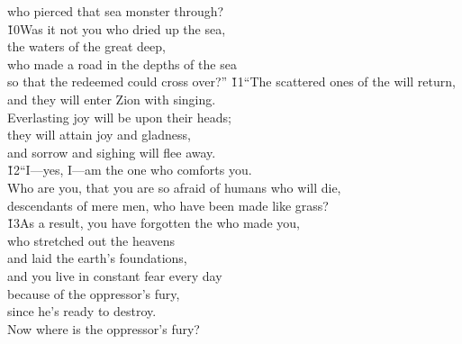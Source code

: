 \begin{poetry}
\poemll    who pierced that sea monster through? \\
\poeml \v{10}Was it not you who dried up the sea, \\
\poemll    the waters of the great deep, \\
\poeml who made a road in the depths of the sea \\
\poemll    so that the redeemed could cross over?''
\poeml \v{11}``The scattered ones of the  will return, \\
\poemll    and they will enter Zion with singing. \\
\poeml Everlasting joy will be upon their heads; \\
\poemll    they will attain joy and gladness, \\
\poemlll       and sorrow and sighing will flee away. \\
\poeml \v{12}``I---yes, I---am the one who comforts you. \\
\poemll    Who are you, that you are so afraid of humans who will die, \\
\poemlll       descendants of mere men, who have been made like grass? \\
\poeml \v{13}As a result, you have forgotten the  who made you, \\
\poemll    who stretched out the heavens \\
\poeml and laid the earth's foundations, \\
\poemll    and you live in constant fear every day \\
\poeml because of the oppressor's fury, \\
\poemll    since he's ready to destroy. \\
\poemlll       Now where is the oppressor's fury? \\

\end{poetry}
